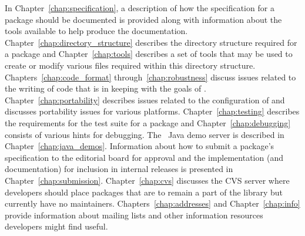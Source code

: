 In Chapter~\ref{chap:specification}, a description of how the specification for 
a package should be documented is provided along with information about
the tools available to help produce the documentation.
Chapter~\ref{chap:directory_structure} describes the directory structure required
for a package and Chapter~\ref{chap:tools} describes a set of tools that
may be used to create or modify various files required within this directory
structure. Chapters~\ref{chap:code_format} through~\ref{chap:robustness}
discuss issues related to the writing of code that is in keeping with
the goals of \cgal.  Chapter~\ref{chap:portability} describes issues
related to the configuration of \cgal and 
discusses portability issues for various platforms. Chapter~\ref{chap:testing} 
describes the requirements for the test suite for a package and 
Chapter~\ref{chap:debugging} consists of various hints for debugging.
The \cgal\
Java demo server is described in Chapter~\ref{chap:java_demos}. Information 
about how to submit a package's specification to the editorial board 
for approval and the implementation (and documentation) for inclusion in 
internal releases is presented in  Chapter~\ref{chap:submission}.
Chapter~\ref{chap:cvs} discusses the CVS server where developers should 
place packages that are to remain a part of the library but currently have 
no maintainers.  Chapters~\ref{chap:addresses} and Chapter~\ref{chap:info} 
provide information about mailing lists and other information 
resources developers might find useful.







